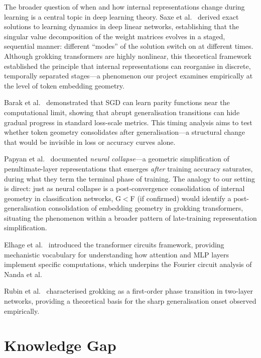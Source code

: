 \documentclass[12pt,openany,a4paper]{book}
\begin{document}
The broader question of when and how internal representations change
during learning is a central topic in deep learning theory.
Saxe et al.\ \cite{saxe2014exact} derived exact solutions to learning
dynamics in deep linear networks, establishing that the singular
value decomposition of the weight matrices evolves in a staged,
sequential manner: different ``modes'' of the solution switch on at
different times.
Although grokking transformers are highly nonlinear, this theoretical
framework established the principle that internal representations
can reorganise in discrete, temporally separated stages---a
phenomenon our project examines empirically at the level of token
embedding geometry.

Barak et al.\ \cite{barak2022hidden} demonstrated that SGD can learn
parity functions near the computational limit, showing that abrupt
generalisation transitions can hide gradual progress in standard
loss-scale metrics.
This timing analysis aims to test whether token geometry consolidates
after generalisation---a structural change that would be invisible
in loss or accuracy curves alone.

Papyan et al.\ \cite{papyan2020prevalence} documented \emph{neural
collapse}---a geometric simplification of penultimate-layer
representations that emerges \emph{after} training accuracy saturates,
during what they term the terminal phase of training.
The analogy to our setting is direct: just as neural collapse is a
post-convergence consolidation of internal geometry in classification
networks, G$<$F (if confirmed) would identify a post-generalisation
consolidation of embedding geometry in grokking transformers,
situating the phenomenon within a broader pattern of late-training
representation simplification.

Elhage et al.\ \cite{elhage2021mathematical} introduced the
transformer circuits framework, providing mechanistic vocabulary
for understanding how attention and MLP layers implement specific
computations, which underpins the Fourier circuit analysis of
Nanda et al.

Rubin et al.\ \cite{rubin2024grokking} characterised grokking as
a first-order phase transition in two-layer networks, providing a
theoretical basis for the sharp generalisation onset observed
empirically.

\section{Knowledge Gap}
\end{document}
